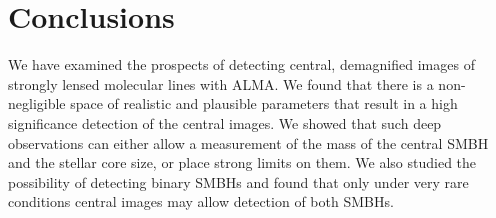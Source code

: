 \documentclass[chicago]{emulateapj}
\begin{document}
\section{Conclusions}
We have examined the prospects of detecting central, demagnified images of strongly lensed molecular lines with ALMA. We found that there is a non-negligible space of realistic and plausible parameters that result in a high significance detection of the central images. We showed that such deep observations can either allow a measurement of the mass of the central SMBH and the stellar core size, or place strong limits on them.
We also studied the possibility of detecting binary SMBHs and found that only under very rare conditions central images may allow detection of both SMBHs. 






\end{document}
